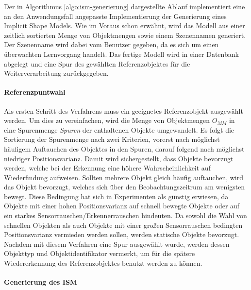 Der in Algorithmus \vref{algo:ism-generierung} dargestellte Ablauf implementiert eine an den Anwendungsfall angepasste Implementierung der Generierung eines Implicit Shape Models.
Wie im Voraus schon erwähnt, wird das Modell aus einer zeitlich sortierten Menge von Objektmengen sowie einem Szenennamen generiert.
Der Szenenname wird dabei vom Benutzer gegeben, da es sich um einen überwachten Lernvorgang handelt.
Das fertige Modell wird in einer Datenbank abgelegt und eine Spur des gewählten Referenzobjektes für die Weiterverarbeitung zurückgegeben.

\paragraph{Referenzpuntwahl}
Als ersten Schritt des Verfahrens muss ein geeignetes Referenzobjekt ausgewählt werden.
Um dies zu vereinfachen, wird die Menge von Objektmengen $O_{MM}$ in eine Spurenmenge \textit{Spuren} der enthaltenen Objekte umgewandelt.
Es folgt die Sortierung der Spurenmenge nach zwei Kriterien, vorerst nach möglichst häufigem Auftauchen des Objektes in den Spuren, darauf folgend nach möglichst niedriger Positionsvarianz.
Damit wird sichergestellt, dass Objekte bevorzugt werden, welche bei der Erkennung eine höhere Wahrscheinlichkeit auf Wiederfindung aufweisen.
Sollten mehrere Objekt gleich häufig auftauchen, wird das Objekt bevorzugt, welches sich über den Beobachtungszeitrum am wenigsten bewegt.
Diese Bedingung hat sich in Experimenten als günstig erwiesen, da Objekte mit einer hohen Positionsvarianz auf schnell bewegte Objekte oder auf ein starkes Sensorrauschen/Erkennerrauschen hindeuten.
Da sowohl die Wahl von schnellen Objekten als auch Objekte mit einer großen Sensorrauschen bedingten Positionsvarianz vermieden werden sollen, werden statische Objekte bevorzugt.
Nachdem mit diesem Verfahren eine Spur ausgewählt wurde, werden dessen Objekttyp und Objektidentifikator vermerkt, um für die spätere Wiedererkennung des Referenzobjektes benutzt werden zu können.

\paragraph{Generierung des ISM}


